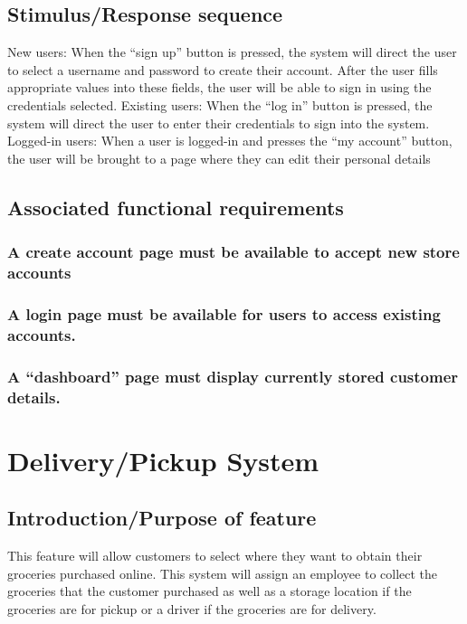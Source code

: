 \documentclass{scrreprt}
\begin{document}
\subsection{Stimulus/Response sequence}
\indent New users: When the “sign up” button is pressed, the system will direct the user to select a username and password to create their account.  After the user fills appropriate values into these fields, the user will be able to sign in using the credentials selected.
Existing users: When the “log in” button is pressed, the system will direct the user to enter their credentials to sign into the system.  
Logged-in users: When a user is logged-in and presses the “my account” button, the user will be brought to a page where they can edit their personal details

\subsection{Associated functional requirements}
\subsubsection[]{\normalfont A create account page must be available to accept new store accounts}
\subsubsection[]{\normalfont A login page must be available for users to access existing accounts.}
\subsubsection[]{\normalfont A “dashboard” page must display currently stored customer details.}

\section{Delivery/Pickup System}
\subsection{Introduction/Purpose of feature}
This feature will allow customers to select where they want to obtain their groceries purchased online.  This system will assign an employee to collect the groceries that the customer purchased as well as a storage location if the groceries are for pickup or a driver if the groceries are for delivery.
\end{document}
